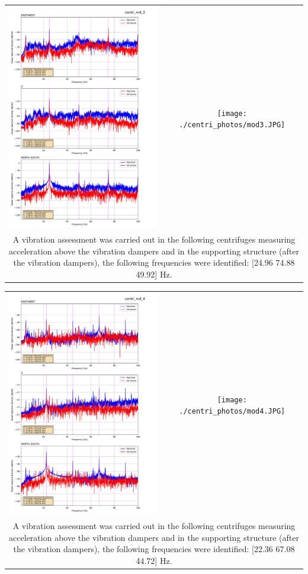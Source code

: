 \documentclass{article}
\begin{document}
\begin{center}
\begin{tabular*}{0.6\textwidth}{@{\extracolsep{\fill}}cc}
\includegraphics[width=0.3\linewidth, valign=c]{./centri_md_3_comparison.pdf} &
\texttt{[image: ./centri\_photos/mod3.JPG]} \\
\multicolumn{2}{|p{0.6\textwidth}|}{A vibration assessment was carried out in the following centrifuges measuring acceleration above the vibration dampers and in the supporting structure (after the vibration dampers), the following frequencies were identified: [24.96 74.88 49.92] Hz.
} \\
\end{tabular*}
\end{center}
\newpage
\begin{center}
\begin{tabular*}{0.6\textwidth}{@{\extracolsep{\fill}}cc}
\includegraphics[width=0.3\linewidth, valign=c]{./centri_md_4_comparison.pdf} &
\texttt{[image: ./centri\_photos/mod4.JPG]} \\
\multicolumn{2}{|p{0.6\textwidth}|}{A vibration assessment was carried out in the following centrifuges measuring acceleration above the vibration dampers and in the supporting structure (after the vibration dampers), the following frequencies were identified: [22.36 67.08 44.72] Hz.
} \\
\end{tabular*}
\end{center}
\end{document}
